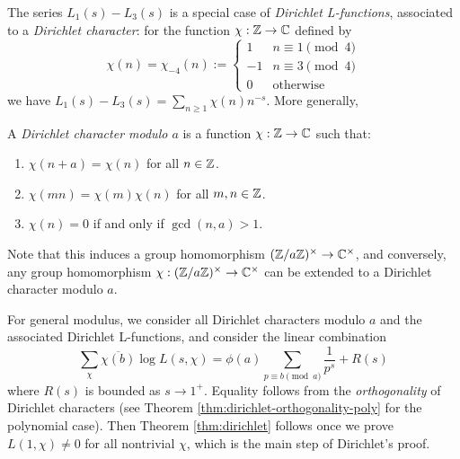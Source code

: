 The series $L_1(s) - L_3(s)$ is a special case of \emph{Dirichlet L-functions}, associated to a \emph{Dirichlet character}: for the function $\chi: \mathbb{Z} \to \mathbb{C}$ defined by
\begin{equation}
    \chi(n) = \chi_{-4}(n) := \begin{cases}
        1 & n \equiv 1 \pmod{4} \\
        -1 & n \equiv 3 \pmod{4} \\
        0 & \text{otherwise}
    \end{cases}
\end{equation}
we have $L_1(s) - L_3(s) = \sum_{n \ge 1} \chi(n) n^{-s}$.
More generally,
\begin{definition}
    A \emph{Dirichlet character modulo $a$} is a function $\chi: \mathbb{Z} \to \mathbb{C}$ such that:
    \begin{enumerate}
        \item $\chi(n + a) = \chi(n)$ for all $n \in \mathbb{Z}$.
        \item $\chi(mn) = \chi(m)\chi(n)$ for all $m, n \in \mathbb{Z}$.
        \item $\chi(n) = 0$ if and only if $\gcd(n, a) > 1$.
    \end{enumerate}
\end{definition}
Note that this induces a group homomorphism $(\mathbb{Z} / a\mathbb{Z})^\times \to \mathbb{C}^\times$, and conversely, any group homomorphism $\chi: (\mathbb{Z} / a\mathbb{Z})^\times \to \mathbb{C}^\times$ can be extended to a Dirichlet character modulo $a$.

For general modulus, we consider all Dirichlet characters modulo $a$ and the associated Dirichlet L-functions, and consider the linear combination
\[
\sum_{\chi} \overline{\chi(b)} \log L(s, \chi) = \phi(a) \sum_{p \equiv b \pmod{a}} \frac{1}{p^s} + R(s)
\]
where $R(s)$ is bounded as $s \to 1^+$.
Equality follows from the \emph{orthogonality} of Dirichlet characters (see Theorem \ref{thm:dirichlet-orthogonality-poly} for the polynomial case).
Then Theorem \ref{thm:dirichlet} follows once we prove $L(1, \chi) \ne 0$ for all nontrivial $\chi$, which is the main step of Dirichlet's proof.

